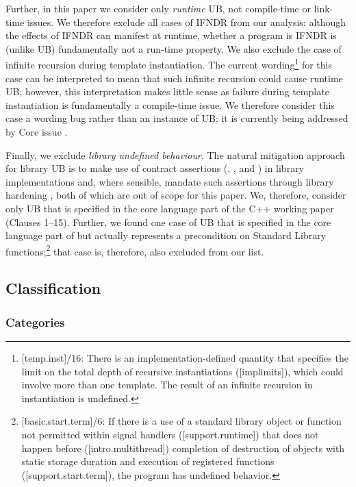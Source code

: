 Further, in this paper we consider only \emph{runtime} UB, not compile-time or link-time issues. We therefore exclude all cases of IFNDR from our analysis: although the effects of IFNDR can manifest at runtime, whether a program is IFNDR is (unlike UB) fundamentally not a run-time property.
We also exclude the case of infinite recursion during template instantiation. The current wording\footnote{[temp.inst]/16: There is an implementation-defined quantity that specifies the limit on the total depth of recursive instantiations ([implimits]), which could involve more than one template. The result of an infinite recursion in instantiation is undefined.} for this case can be interpreted to mean that such infinite recursion could cause runtime UB; however, this interpretation makes little sense as failure during template instantiation is fundamentally a compile-time issue. We therefore consider this case a wording bug rather than an instance of UB; it is currently being addressed by Core issue \cite{CWG3034}.

Finally, we exclude \emph{library undefined behaviour}. The natural mitigation approach for library UB is to make use of contract assertions (, , and ) in library implementations and, where sensible, mandate such assertions through library hardening \cite{P3471R4}, both of which are out of scope for this paper. We, therefore, consider only UB that is specified in the core language part of the C++ working paper (Clauses 1--15). Further, we found one case of UB that is specified in the core language part of \cite{N5008} but actually represents a precondition on Standard Library functions;\footnote{[basic.start.term]/6: If there is a use of a standard library object or function not permitted within signal handlers ([support.runtime]) that does not happen before ([intro.multithread]) completion of destruction of objects with static storage duration and execution of  registered functions ([support.start.term]), the program has undefined behavior.}
that case is, therefore, also excluded from our list.


\subsection{Classification}


\subsubsection{Categories}
\label{categories}

